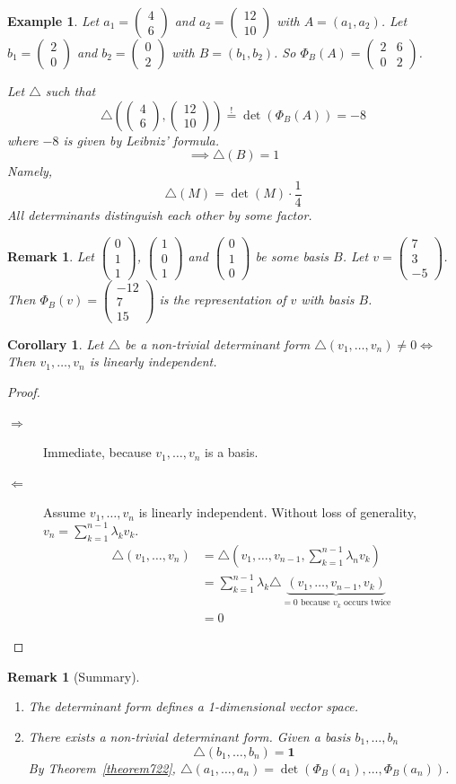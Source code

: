 \documentclass{article}
\newcounter{lecref}[section]
\numberwithin{lecref}{section}
\newtheorem{example}[lecref]{Example}
\newtheorem{remark}[lecref]{Remark}
\newtheorem{corollary}[lecref]{Corollary}
\newcommand{\vectwo}[2]{\begin{pmatrix} #1 \\ #2 \end{pmatrix}}
\newcommand{\vecthree}[3]{\begin{pmatrix} #1 \\ #2 \\ #3 \end{pmatrix}}
\begin{document}
\begin{example}
  Let $a_1 = \vectwo46$ and $a_2 = \vectwo{12}{10}$ with $A = (a_1, a_2)$.
  Let $b_1 = \vectwo20$ and $b_2 = \vectwo02$ with $B = (b_1, b_2)$.
  So $\Phi_B(A) = \begin{pmatrix} 2 & 6 \\ 0 & 2 \end{pmatrix}$.

  Let $\triangle$ such that
  \[ \triangle(\vectwo46, \vectwo{12}{10}) \overset!= \det(\Phi_B(A)) = -8 \]
  where $-8$ is given by Leibniz' formula.
  \[ \implies \triangle(B) = 1 \]
  Namely,
  \[ \triangle(M) = \det(M) \cdot \frac14 \]
  All determinants distinguish each other by some factor.
\end{example}

\begin{remark}
  Let $\vecthree011$, $\vecthree101$ and $\vecthree010$ be some basis $B$.
  Let $v = \vecthree{7}{3}{-5}$. Then $\Phi_B(v) = \vecthree{-12}{7}{15}$ is the representation of $v$ with basis $B$.
\end{remark}

\begin{corollary} %
  \label{folgerung723}
  Let $\triangle$ be a non-trivial determinant form $\triangle(v_1, \dots, v_n) \neq 0 \iff$
  Then $v_1, \dots, v_n$ is linearly independent.
\end{corollary}
\begin{proof}
  \begin{description}
    \item[$\Rightarrow$] Immediate, because $v_1, \dots, v_n$ is a basis.
    \item[$\Leftarrow$]
      Assume $v_1, \dots, v_n$ is linearly independent.
      Without loss of generality, $v_n = \sum_{k=1}^{n-1} \lambda_k v_k$.
      \begin{align*}
        \triangle(v_1, \dots, v_n)
          &= \triangle(v_1, \dots, v_{n-1}, \sum_{k=1}^{n-1} \lambda_n v_k) \\
          &= \sum_{k=1}^{n-1} \lambda_k \triangle \underbrace{(v_1, \dots, v_{n-1}, v_k)}_{=0 \text{ because $v_k$ occurs twice}} \\
          &= 0
      \end{align*}
  \end{description}
\end{proof}

\begin{remark}[Summary]
  \begin{enumerate}
    \item The determinant form defines a 1-dimensional vector space.
    \item There exists a non-trivial determinant form. Given a basis $b_1, \dots, b_n$
      \[ \triangle(b_1, \dots, b_n) = \mathbf 1 \]
      By Theorem~\ref{theorem722}, $\triangle(a_1, \dots, a_n) = \det(\Phi_B(a_1), \dots, \Phi_B(a_n))$.
  \end{enumerate}
\end{remark}
\end{document}
